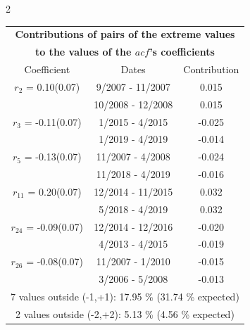 
\thispagestyle{empty}
\begin{multicols}{2}{ 
\begin{tabular}{ccc}
\multicolumn{3}{c}{\textbf{Contributions of pairs of the extreme values} }  \vspace{-.10in}  \\ 
\multicolumn{3}{c}{ \textbf{to the values of the $acf$'s coefficients}} \\ 
\hline 
\hline                  Coefficient  &  Dates &  Contribution \\ 
\hline 
  $r_{ 2}$ = 0.10(0.07) &       9/2007 - 11/2007 &        0.015   \vspace{-.10in} \\  
&       10/2008 - 12/2008 &        0.015  \vspace{-.02in} \\ \hline 
  $r_{ 3}$ = -0.11(0.07) &       1/2015 -  4/2015 &       -0.025    \vspace{-.10in} \\ 
  &        1/2019 -  4/2019 &       -0.014  \vspace{-.02in}   \\ \hline 
    $r_{ 5}$ = -0.13(0.07) &      11/2007 -  4/2008 &       -0.024    \vspace{-.10in} \\ 
  &       11/2018 -  4/2019 &       -0.016  \vspace{-.02in}   \\ \hline 
    $r_{11}$ = 0.20(0.07) &      12/2014 - 11/2015 &        0.032   \vspace{-.10in} \\  
&        5/2018 -  4/2019 &        0.032  \vspace{-.02in} \\ \hline 
  $r_{24}$ = -0.09(0.07) &      12/2014 - 12/2016 &       -0.020    \vspace{-.10in} \\ 
  &        4/2013 -  4/2015 &       -0.019  \vspace{-.02in}   \\ \hline 
    $r_{26}$ = -0.08(0.07) &      11/2007 -  1/2010 &       -0.015    \vspace{-.10in} \\ 
  &        3/2006 -  5/2008 &       -0.013  \vspace{-.02in}   \\ \hline 
  \multicolumn{3}{c}{               7 values outside (-1,+1): 17.95  \% (31.74  \% expected)}\vspace{-.10in} \\ 
\multicolumn{3}{c}{               2 values outside (-2,+2):  5.13 \%  (4.56 \% expected) } \\
 \end{tabular} \\ 
 } 
\end{multicols} 
